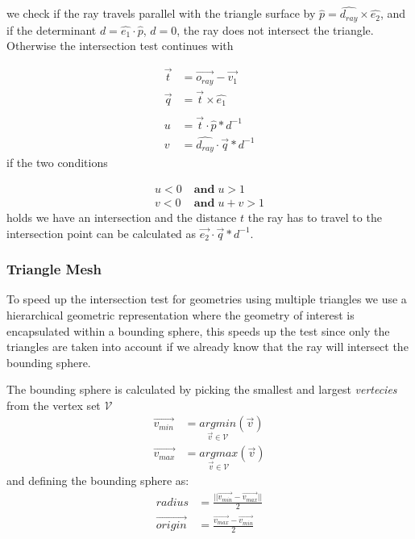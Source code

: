 \documentclass[a4paper, twocolumn]{article}
\begin{document}
we check if the ray travels parallel with the triangle surface by \(\hat{p} = \hat{d_{ray}} \times \hat{e_2}\), and if the determinant  \(d = \hat{e_1} \cdot \hat{p}\), \(d = 0 \), the ray does not intersect the triangle. Otherwise the intersection test continues with

\begin{align*}
    \vec{t} &= \vec{o_{ray}} - \vec{v_1} \\
    \vec{q} &= \vec{t} \times \hat{e_1} \\\\
    u &= \vec{t} \cdot \hat{p} * d^{-1} \\
    v &= \hat{d_{ray}} \cdot \vec{q} * d^{-1}
\end{align*} 
if the two conditions
 
\begin{align*}
    u < 0 \; &\textbf{and} \; u > 1 \\
    v < 0 \; &\textbf{and}  \; u + v > 1 
\end{align*}
holds we have an intersection and the distance \(t\) the ray has to travel to the intersection point can be calculated as \(\vec{e_2} \cdot \vec{q} * d^{-1} \).

        
        \subsubsection{Triangle Mesh} \label{sec:triangle_mesh}
        
        To speed up the intersection test for geometries using multiple triangles we use a hierarchical geometric representation where the geometry of interest is encapsulated within a bounding sphere, this speeds up the test since only the triangles are taken into account if we already know that the ray will intersect the bounding sphere.

    The bounding sphere is calculated by picking the smallest and largest \textit{vertecies} from the vertex set \(\mathcal{V}\)
    \begin{align*} 
        \vec{v_{min}} &= \underset{\vec{v} \in \mathcal{V}}{argmin}(\vec{v}) \\
        \vec{v_{max}} &= \underset{\vec{v} \in \mathcal{V}}{argmax}(\vec{v})
    \end{align*}
    and defining the bounding sphere as:
    \begin{align*}
        radius &= \frac{ || \vec{v_{min}} - \vec{v_{max}} ||}{2} \\
        \vec{origin} &= \frac{\vec{v_{max}} - \vec{v_{min}}}{2}
    \end{align*}
\end{document}
